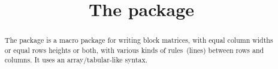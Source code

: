 \documentclass[a4paper]{article}
\title{The package \package{easymat}}
\begin{document}
\maketitle
\begin{abstract}
  The 
  package is a macro package for writing block matrices, with equal
  column widths or equal rows heights or both, with various kinds of
  rules~(lines) between rows and columns.  It uses an
  array/ta\-bular-like syntax.
\end{abstract}

\tableofcontents
\clearpage

\pagestyle{fpage}
\def\sectionmark#1{\markboth{The package \package{easymat}}{The package \package{easymat}}}
\let\chaptermark\sectionmark
\let\subsectionmark\sectionmark
\end{document}

